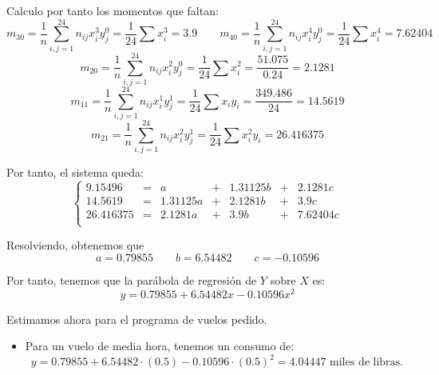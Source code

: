 \begin{ejercicio}
\begin{enumerate}
        Calculo por tanto los momentos que faltan:
        \begin{equation*}
            m_{30} = \frac{1}{n}\sum_{i,j=1}^{24} n_{ij}x_i^3 y_j^0 = \frac{1}{24} \sum x_i^3 = 3.9
            \qquad
            m_{40} = \frac{1}{n}\sum_{i,j=1}^{24} n_{ij}x_i^4 y_j^0 = \frac{1}{24} \sum x_i^4 = 7.62404
        \end{equation*}
        \begin{equation*}
            m_{20} = \frac{1}{n}\sum_{i,j=1}^{24} n_{ij}x_i^2 y_j^0 = \frac{1}{24} \sum x_i^2 = \frac{51.075}{0.24} = 2.1281
        \end{equation*}
        \begin{equation*}
            m_{11} = \frac{1}{n}\sum_{i,j=1}^{24} n_{ij}x_i^1 y_j^1 = \frac{1}{24} \sum x_iy_i = \frac{349.486}{24} = 14.5619
        \end{equation*}
        \begin{equation*}
            m_{21} = \frac{1}{n}\sum_{i,j=1}^{24} n_{ij}x_i^2 y_j^1 = \frac{1}{24} \sum x_i^2 y_i = 26.416375
        \end{equation*}

        Por tanto, el sistema queda:
        \begin{equation*}
            \left\{ \begin{array}{rcrcrcr}
                9.15496 &=& a &+&1.31125 b &+& 2.1281  c  \\
                14.5619&=& 1.31125a &+& 2.1281 b &+&3.9 c  \\
                26.416375 &=& 2.1281 a &+& 3.9 b &+&7.62404 c  \\
            \end{array}\right.
        \end{equation*}
        
        Resolviendo, obtenemos que
        \begin{equation*}
            a=0.79855\qquad b=6.54482 \qquad c=-0.10596
        \end{equation*}

        Por tanto, tenemos que la parábola de regresión de $Y$ sobre $X$ es:
        \begin{equation*}
            y=0.79855 + 6.54482x -0.10596x^2
        \end{equation*}

        Estimamos ahora para el programa de vuelos pedido.
        \begin{itemize}
            \item Para un vuelo de media hora, tenemos un consumo de:
            \begin{equation*}
                y = 0.79855 + 6.54482\cdot(0.5) -0.10596\cdot(0.5)^2 = 4.04447 \text{ miles de libras.}
            \end{equation*}


\end{itemize}
\end{enumerate}
\end{ejercicio}
